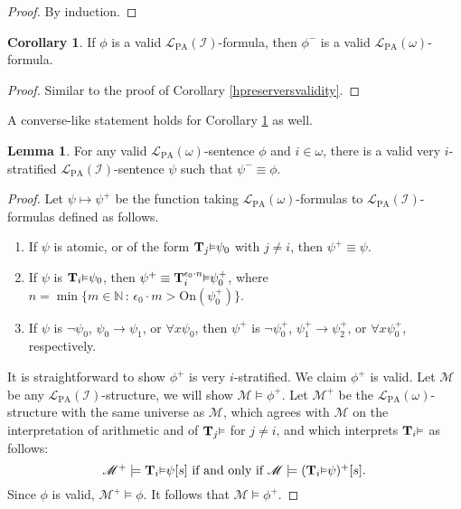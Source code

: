 \documentclass[reqno]{article}
\theoremstyle{definition}
\newtheorem{lemma}[theorem]{Lemma}
\newtheorem{corollary}[theorem]{Corollary}
\def\N{\mathbb{N}}
\def\L{\mathscr{L}}
\def\T{\mathbf{T}}
\def\LPA{\L_{\mathrm{PA}}}
\def\indset{\mathcal I}
\def\onset{\mathrm{On}}
\renewcommand{\Pr}[1]{\T_{#1}\mbox{\small${\vDash}$}}
\newcommand{\Prr}[2]{\T^{#1}_{#2}\mbox{\small${\vDash}$}}
\begin{document}

\begin{proof}
By induction.
\end{proof}

\begin{corollary}
\label{minuspreservesvalidity}
If $\phi$ is a valid $\LPA(\indset)$-formula, then $\phi^-$ is a valid $\LPA(\omega)$-formula.
\end{corollary}

\begin{proof}
Similar to the proof of Corollary \ref{hpreserversvalidity}.
\end{proof}

A converse-like statement holds for Corollary \ref{minuspreservesvalidity} as well.

\begin{lemma}
\label{validitylevator}
For any valid $\LPA(\omega)$-sentence $\phi$ and $i\in\omega$,
there is a valid very $i$-stratified $\LPA(\indset)$-sentence $\psi$
such that $\psi^-\equiv\phi$.
\end{lemma}

\begin{proof}
  Let $\psi\mapsto\psi^+$ be the function taking $\LPA(\omega)$-formulas to
  $\LPA(\indset)$-formulas defined as follows.
  \begin{enumerate}
    \item If $\psi$ is atomic, or of the form $\Pr j\psi_0$ with $j\neq i$,
    then $\psi^+\equiv\psi$.
    \item If $\psi$ is $\Pr i\psi_0$, then $\psi^+ \equiv \Prr {\epsilon_0\cdot n} i \psi_0^+$,
    where $n=\min\{m\in\N\,:\,\epsilon_0\cdot m > \onset(\psi_0^+)\}$.
    \item If $\psi$ is $\neg\psi_0$, $\psi_0\rightarrow\psi_1$, or $\forall x \psi_0$,
    then $\psi^+$ is $\neg\psi_0^+$, $\psi_1^+\rightarrow\psi_2^+$, or $\forall x \psi_0^+$,
    respectively.
  \end{enumerate}
  It is straightforward to show $\phi^+$ is very $i$-stratified.
  We claim $\phi^+$ is valid. Let $\mathscr M$ be any $\LPA(\indset)$-structure,
  we will show $\mathscr M\models\phi^+$.  Let $\mathscr M^+$ be the $\LPA(\omega)$-structure
  with the same universe as $\mathscr M$, which agrees with $\mathscr M$ on the interpretation
  of arithmetic and of $\Pr j$ for $j\not=i$, and which interprets $\Pr i$ as follows:
  \[
    \mbox{
      $\mathscr M^+\models \Pr i \psi[s]$ if and only if $\mathscr M\models (\Pr i\psi)^+[s]$.
    }
  \]
  Since $\phi$ is valid, $\mathscr M^+\models\phi$.
  It follows that $\mathscr M\models\phi^+$.
\end{proof}
\end{document}
